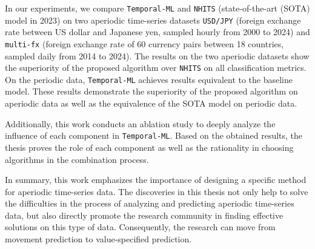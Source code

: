 \documentclass[12pt,a4paper]{article}
\begin{document}

In our experiments, we compare \verb|Temporal-ML| and \verb|NHITS| (state-of-the-art (SOTA) model in 2023) on two aperiodic time-series datasets \verb|USD/JPY| (foreign exchange rate between US dollar and Japanese yen, sampled hourly from 2000 to 2024) and \verb|multi-fx| (foreign exchange rate of 60 currency pairs between 18 countries, sampled daily from 2014 to 2024). The results on the two aperiodic datasets show the superiority of the proposed algorithm over \verb|NHITS| on all classification metrics. On the periodic data, \verb|Temporal-ML| achieves results equivalent to the baseline model. These results demonstrate the superiority of the proposed algorithm on aperiodic data as well as the equivalence of the SOTA model on periodic data.


Additionally, this work conducts an ablation study to deeply analyze the influence of each component in \verb|Temporal-ML|. Based on the obtained results, the thesis proves the role of each component as well as the rationality in choosing algorithms in the combination process.


In summary, this work emphasizes the importance of designing a specific method for aperiodic time-series data. The discoveries in this thesis not only help to solve the difficulties in the process of analyzing and predicting aperiodic time-series data, but also directly promote the research community in finding effective solutions on this type of data. Consequently, the research can move from movement prediction to value-specified prediction.
\end{document}
